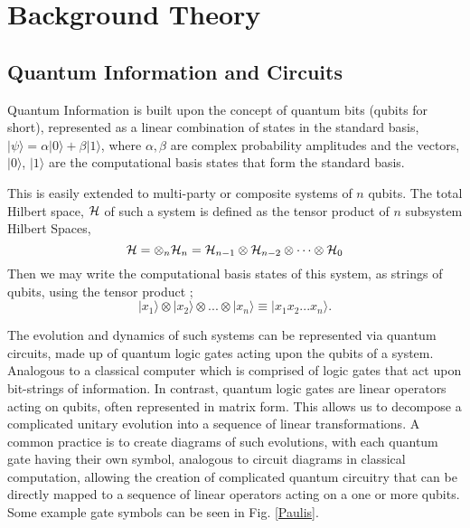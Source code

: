 \section{Background Theory}
\subsection{Quantum Information and Circuits}
\vspace{-0.15in}
Quantum Information is built upon the concept of quantum bits (qubits for short), represented as a linear
combination of states in the standard basis,
$|\psi\rangle = \alpha |0\rangle + \beta |1\rangle$, where $\alpha, \beta$ are complex probability amplitudes
and the vectors, $|0\rangle$, $|1\rangle$ are the computational basis states that form the standard basis.

This is easily extended to multi-party or composite systems of $n$ qubits. The total Hilbert space, $\cal{H}$ of
such a system is defined as the tensor product of $n$ subsystem Hilbert Spaces,
\begin{equation}
    {\cal{H}} = \otimes_n {\cal{H}}_n = {\cal{H}}_{n-1} \otimes {\cal{H}}_{n-2} \otimes \dots \otimes {\cal{H}}_0
\end{equation}
Then we may write the computational basis states of this system, as strings of qubits, using the tensor product \cite{nielsen_chuang_2010};
\[|x_1\rangle \otimes |x_2\rangle \otimes ... \otimes |x_n\rangle \equiv |x_1 x_2... x_n \rangle. \]

The evolution and dynamics of such systems can be represented via quantum circuits, made up of quantum logic gates acting
upon the qubits of a system. Analogous to a classical computer which is comprised of logic gates that act upon
bit-strings of information. In contrast, quantum logic gates are linear operators acting
on qubits, often represented in matrix form. This allows us to decompose a complicated unitary evolution into a
sequence of linear transformations. A common practice is to create
diagrams of such evolutions, with each quantum gate having their own symbol, analogous to circuit diagrams in classical
computation, allowing the creation of complicated quantum circuitry that can be directly mapped to a sequence of linear
operators acting on a one or more qubits. Some example gate symbols can be seen in Fig. \ref{Paulis}.




